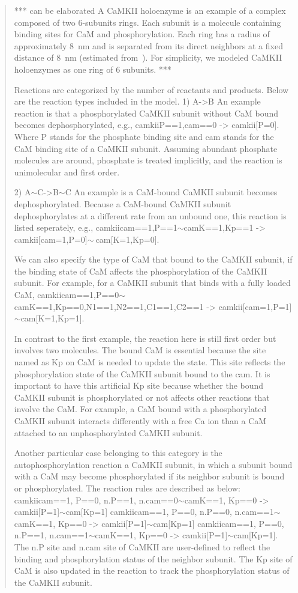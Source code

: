 \begin{quote}
*** can be elaborated
A CaMKII holoenzyme is an example of a complex composed of two 6-subunits rings. Each subunit is a molecule containing binding sites for CaM and phosphorylation. Each ring has a radius of approximately \SI{8}{\nm} and is separated from its direct neighbors at a fixed distance of \SI{8}{\nm} (estimated from~\cite{Gaertner:2004jk}). For simplicity, we modeled CaMKII holoenzymes as one ring of 6 subunits. 
***

Reactions are categorized by the number of reactants and products. Below are the reaction types included in the model.
1) A->B
An example reaction is that a phosphorylated CaMKII subunit without CaM bound becomes
dephosphorylated, e.g.,
camkii{P==1,cam==0} -> camkii[P=0].
Where P stands for the phosphate binding site and cam stands for the CaM binding site of a CaMKII subunit. Assuming abundant phosphate molecules are around, phosphate is treated implicitly, and the reaction is unimolecular and first order.

2) A$\sim$C->B$\sim$C
An example is a CaM-bound CaMKII subunit becomes dephosphorylated. Because a CaM-bound CaMKII subunit dephosphorylates at a different rate from an unbound one, this reaction is listed seperately, e.g.,
camkii{cam==1,P==1}$\sim$cam{K==1,Kp==1} -> camkii[cam=1,P=0]$\sim~$cam[K=1,Kp=0].

We can also specify the type of CaM that bound to the CaMKII subunit, if the binding state of CaM affects the phosphorylation of the CaMKII subunit. For example, for a CaMKII subunit that binds with a fully loaded CaM,
camkii{cam==1,P==0}$\sim$cam{K==1,Kp==0,N1==1,N2==1,C1==1,C2==1} -> camkii[cam=1,P=1]$\sim$cam[K=1,Kp=1].

In contrast to the first example, the reaction here is still first order but involves two molecules. The bound CaM is essential because the site named as Kp on CaM is needed to update the state. This site reflects the phosphorylation state of the CaMKII subunit bound to the cam. It is important to have this artificial Kp site because whether the bound CaMKII subunit is phosphorylated or not affects other reactions that involve the CaM. For example, a CaM bound with a phosphorylated CaMKII subunit interacts differently with a free Ca ion than a CaM attached to an unphosphorylated CaMKII subunit.

Another particular case belonging to this category is the autophosphorylation reaction a CaMKII subunit, in which a subunit bound with a CaM may become phosphorylated if its neighbor subunit is bound or phosphorylated. The reaction rules are described as below:
camkii{cam==1, P==0, n.P==1, n.cam==0}$\sim$cam{K==1, Kp==0} -> camkii[P=1]$\sim$cam[Kp=1]
camkii{cam==1, P==0, n.P==0, n.cam==1}$\sim$cam{K==1, Kp==0} -> camkii[P=1]$\sim$cam[Kp=1]
camkii{cam==1, P==0, n.P==1, n.cam==1}$\sim$cam{K==1, Kp==0} -> camkii[P=1]$\sim$cam[Kp=1].
The n.P site and n.cam site of CaMKII are user-defined to reflect the binding and phosphorylation status of the neighbor subunit. The Kp site of CaM is also updated in the reaction to track the phosphorylation status of the CaMKII subunit.


\end{quote}
